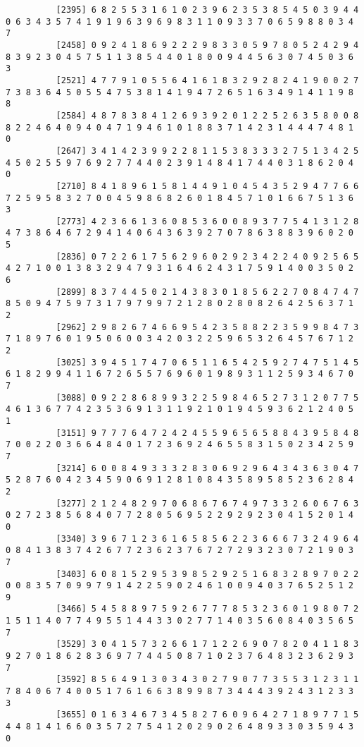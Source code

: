 \documentclass{article}
\begin{document}
\begin{itemize}
\begin{scriptsize}
\begin{verbatim}
		  [2395] 6 8 2 5 5 3 1 6 1 0 2 3 9 6 2 3 5 3 8 5 4 5 0 3 9 4 4 0 6 3 4 3 5 7 4 1 9 1 9 6 3 9 6 9 8 3 1 1 0 9 3 3 7 0 6 5 9 8 8 0 3 4 7
		  [2458] 0 9 2 4 1 8 6 9 2 2 2 9 8 3 3 0 5 9 7 8 0 5 2 4 2 9 4 8 3 9 2 3 0 4 5 7 5 1 1 3 8 5 4 4 0 1 8 0 0 9 4 4 5 6 3 0 7 4 5 0 3 6 3
		  [2521] 4 7 7 9 1 0 5 5 6 4 1 6 1 8 3 2 9 2 8 2 4 1 9 0 0 2 7 7 3 8 3 6 4 5 0 5 5 4 7 5 3 8 1 4 1 9 4 7 2 6 5 1 6 3 4 9 1 4 1 1 9 8 8
		  [2584] 4 8 7 8 3 8 4 1 2 6 9 3 9 2 0 1 2 2 5 2 6 3 5 8 0 0 8 8 2 2 4 6 4 0 9 4 0 4 7 1 9 4 6 1 0 1 8 8 3 7 1 4 2 3 1 4 4 4 7 4 8 1 0
		  [2647] 3 4 1 4 2 3 9 9 2 2 8 1 1 5 3 8 3 3 3 2 7 5 1 3 4 2 5 4 5 0 2 5 5 9 7 6 9 2 7 7 4 4 0 2 3 9 1 4 8 4 1 7 4 4 0 3 1 8 6 2 0 4 0
		  [2710] 8 4 1 8 9 6 1 5 8 1 4 4 9 1 0 4 5 4 3 5 2 9 4 7 7 6 6 7 2 5 9 5 8 3 2 7 0 0 4 5 9 8 6 8 2 6 0 1 8 4 5 7 1 0 1 6 6 7 5 1 3 6 3
		  [2773] 4 2 3 6 6 1 3 6 0 8 5 3 6 0 0 8 9 3 7 7 5 4 1 3 1 2 8 4 7 3 8 6 4 6 7 2 9 4 1 4 0 6 4 3 6 3 9 2 7 0 7 8 6 3 8 8 3 9 6 0 2 0 5
		  [2836] 0 7 2 2 6 1 7 5 6 2 9 6 0 2 9 2 3 4 2 2 4 0 9 2 5 6 5 4 2 7 1 0 0 1 3 8 3 2 9 4 7 9 3 1 6 4 6 2 4 3 1 7 5 9 1 4 0 0 3 5 0 2 6
		  [2899] 8 3 7 4 4 5 0 2 1 4 3 8 3 0 1 8 5 6 2 2 7 0 8 4 7 4 7 8 5 0 9 4 7 5 9 7 3 1 7 9 7 9 9 7 2 1 2 8 0 2 8 0 8 2 6 4 2 5 6 3 7 1 2
		  [2962] 2 9 8 2 6 7 4 6 6 9 5 4 2 3 5 8 8 2 2 3 5 9 9 8 4 7 3 7 1 8 9 7 6 0 1 9 5 0 6 0 0 3 4 2 0 3 2 2 5 9 6 5 3 2 6 4 5 7 6 7 1 2 2
		  [3025] 3 9 4 5 1 7 4 7 0 6 5 1 1 6 5 4 2 5 9 2 7 4 7 5 1 4 5 6 1 8 2 9 9 4 1 1 6 7 2 6 5 5 7 6 9 6 0 1 9 8 9 3 1 1 2 5 9 3 4 6 7 0 7
		  [3088] 0 9 2 2 8 6 8 9 9 3 2 2 5 9 8 4 6 5 2 7 3 1 2 0 7 7 5 4 6 1 3 6 7 7 4 2 3 5 3 6 9 1 3 1 1 9 2 1 0 1 9 4 5 9 3 6 2 1 2 4 0 5 1
		  [3151] 9 7 7 7 6 4 7 2 4 2 4 5 5 9 6 5 6 5 8 8 4 3 9 5 8 4 8 7 0 0 2 2 0 3 6 6 4 8 4 0 1 7 2 3 6 9 2 4 6 5 5 8 3 1 5 0 2 3 4 2 5 9 7
		  [3214] 6 0 0 8 4 9 3 3 3 2 8 3 0 6 9 2 9 6 4 3 4 3 6 3 0 4 7 5 2 8 7 6 0 4 2 3 4 5 9 0 6 9 1 2 8 1 0 8 4 3 5 8 9 5 8 5 2 3 6 2 8 4 2
		  [3277] 2 1 2 4 8 2 9 7 0 6 8 6 7 6 7 4 9 7 3 3 2 6 0 6 7 6 3 0 2 7 2 3 8 5 6 8 4 0 7 7 2 8 0 5 6 9 5 2 2 9 2 9 2 3 0 4 1 5 2 0 1 4 0
		  [3340] 3 9 6 7 1 2 3 6 1 6 5 8 5 6 2 2 3 6 6 6 7 3 2 4 9 6 4 0 8 4 1 3 8 3 7 4 2 6 7 7 2 3 6 2 3 7 6 7 2 7 2 9 3 2 3 0 7 2 1 9 0 3 7
		  [3403] 6 0 8 1 5 2 9 5 3 9 8 5 2 9 2 5 1 6 8 3 2 8 9 7 0 2 2 0 0 8 3 5 7 0 9 9 7 9 1 4 2 2 5 9 0 2 4 6 1 0 0 9 4 0 3 7 6 5 2 5 1 2 9
		  [3466] 5 4 5 8 8 9 7 5 9 2 6 7 7 7 8 5 3 2 3 6 0 1 9 8 0 7 2 1 5 1 1 4 0 7 7 4 9 5 5 1 4 4 3 3 0 2 7 7 1 4 0 3 5 6 0 8 4 0 3 5 6 5 7
		  [3529] 3 0 4 1 5 7 3 2 6 6 1 7 1 2 2 6 9 0 7 8 2 0 4 1 1 8 3 9 2 7 0 1 8 6 2 8 3 6 9 7 7 4 4 5 0 8 7 1 0 2 3 7 6 4 8 3 2 3 6 2 9 3 7
		  [3592] 8 5 6 4 9 1 3 0 3 4 3 0 2 7 9 0 7 7 3 5 5 3 1 2 3 1 1 7 8 4 0 6 7 4 0 0 5 1 7 6 1 6 6 3 8 9 9 8 7 3 4 4 4 3 9 2 4 3 1 2 3 3 3
		  [3655] 0 1 6 3 4 6 7 3 4 5 8 2 7 6 0 9 6 4 2 7 1 8 9 7 7 1 5 4 4 8 1 4 1 6 6 0 3 5 7 2 7 5 4 1 2 0 2 9 0 2 6 4 8 9 3 3 0 3 5 9 4 3 0
		\end{verbatim}
	\end{scriptsize}
	

\end{itemize}
\end{document}
